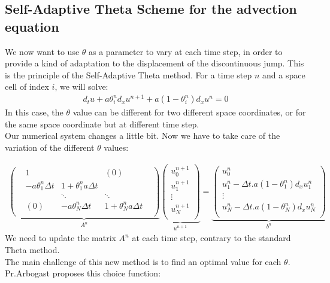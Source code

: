 \documentclass[12pt]{article}
\begin{document}
\subsection{Self-Adaptive Theta Scheme for the advection equation}
We now want to use $\theta$ as a parameter to vary at each time step, in order to provide a kind of adaptation to the displacement of the discontinuous jump.
This is the principle of the Self-Adaptive Theta method. For a time step $n$ and a space cell of index $i$, we will solve:
\begin{align*}
    d_t u + a\theta_i^n d_x u^{n+1} + a(1-\theta_i^n) d_x u^n = 0 \tag{3a}
\end{align*}
In this case, the $\theta$ value can be different for two different space coordinates, or for the same space coordinate but at different time step.\\
Our numerical system changes a little bit. Now we have to take care of the variation of the different $\theta$ values:

\[
\begin{array}{c}
\underbrace{
    \begin{pmatrix}
    & 1 & & (0) &\\
    & -a\theta_1^n \Delta t & 1+\theta_1^n a \Delta t & & \\
    & & \ddots & \ddots \\
    & (0) & -a\theta_N^n\Delta t & 1+\theta_N^n a \Delta t \\
    \end{pmatrix}
}_{\text{$A^n$}}

\underbrace{
    \begin{pmatrix}
    u_0^{n+1}\\
    u_1^{n+1}\\
    \vdots \\
    u_N^{n+1}\\
    \end{pmatrix}
}_{\text{$u^{n+1}$}}
=
\underbrace{
    \begin{pmatrix}
    u_0^n\\
    u_1^n - \Delta t .a(1-\theta_1^n)d_x u_1^n\\
    \vdots \\
    u_{N}^n - \Delta t .a(1-\theta_N^n)d_x u_{N}^n\\
    \end{pmatrix}
}_{b^n} \tag{3b}
\end{array}
\]
We need to update the matrix $A^n$ at each time step, contrary to the standard Theta method.\\
The main challenge of this new method is to find an optimal value for each $\theta$. Pr.Arbogast proposes this choice function:
\end{document}
